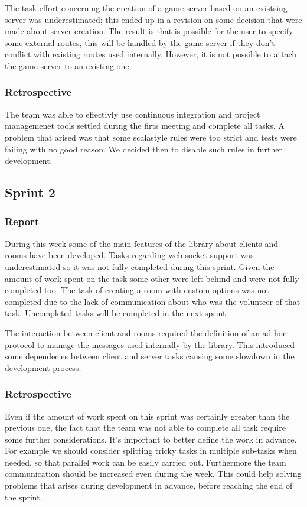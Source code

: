 The task effort concerning the creation of a game server based on an existsing server was underestimated; this ended up in a revision on some decision that were made about server creation. The result is that is possible for the user to specify some external routes, this will be handled by the game server if they don't conflict with existing routes used internally. 
However, it is not possible to attach the game server to an existing one.





\subsubsection{Retrospective}
The team was able to effectivly use continuous integration and project managemenet tools settled during the firts meeting  and complete all tasks.
A problem that arised was that some scalastyle rules were too strict and tests were failing with no good reason. We decided then to disable such rules in further development.

\subsection{Sprint 2}
\subsubsection{Report}

During this week some of the main features of the library about clients and rooms have been developed.
Tasks regarding web socket support was underestimated so it was not fully completed during this sprint. Given the amount of work spent on the task some other were left behind and were not fully completed too.
The task of creating a room with custom options was not completed due to the lack of communication about who was the volunteer of that task.
Uncompleted tasks will be completed in the next sprint.

The interaction between client and rooms required the definition of an ad hoc protocol to manage the messages used internally by the library. This introduced some dependecies between client and server tasks causing some slowdown in the development process.



\subsubsection{Retrospective}
Even if the amount of work spent on this sprint was certainly greater than the previous one, the fact that the team was not able to complete all task require some further considerations.
It's important to better define the work in advance. For example we should consider splitting tricky tasks in multiple sub-tasks when needed, so that parallel work can be easily carried out.
Furthermore the team communication should be increased even during the week.
This could help solving problems that arises during development in advance, before reaching the end of the sprint.



